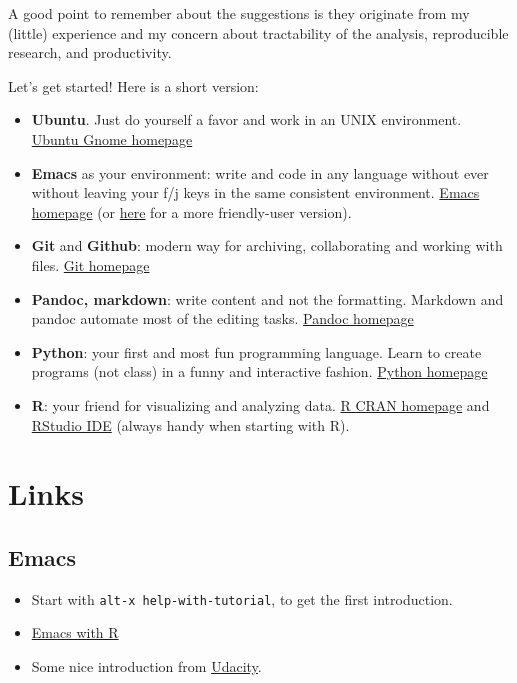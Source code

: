 \documentclass[11pt]{article}
\begin{document}
A good point to remember about the suggestions is they originate from my
(little) experience and my concern about tractability of the analysis,
reproducible research, and productivity.

Let's get started!  Here is a short version:
\begin{itemize}
\item \textbf{Ubuntu}. Just do yourself a favor and work in an UNIX environment.
\href{https://ubuntugnome.org/}{Ubuntu Gnome homepage}
\item \textbf{Emacs} as your environment: write and code in any language without ever
without leaving your f/j keys in the same consistent environment.
\href{https://www.gnu.org/software/emacs/}{Emacs homepage} (or \href{http://vgoulet.act.ulaval.ca/en/emacs/}{here} for a more friendly-user version).
\item \textbf{Git} and \textbf{Github}: modern way for archiving, collaborating and working
with files.
\href{https://git-scm.com/}{Git homepage}
\item \textbf{Pandoc, markdown}: write content and not the formatting. Markdown and pandoc
automate most of the editing tasks.
\href{http://pandoc.org/}{Pandoc homepage}
\item \textbf{Python}: your first and most fun programming language. Learn to create
programs (not class) in a funny and interactive fashion.
\href{https://www.python.org/}{Python homepage}
\item \textbf{R}: your friend for visualizing and analyzing data.
\href{https://cran.r-project.org/}{R CRAN homepage} and \href{https://www.rstudio.com/}{RStudio IDE} (always handy when starting with R).
\end{itemize}

\section{Links}
\label{sec:org5437cbb}
\subsection{Emacs}
\label{sec:org0f2c551}
\begin{itemize}
\item Start with \texttt{alt-x help-with-tutorial}, to get the first introduction.
\item \href{http://ess.r-project.org/index.php?Section=download}{Emacs with R}
\item Some nice introduction from \href{https://www.youtube.com/channel/UCGM8KgUXqsS4d8-4rgWRWKg}{Udacity}.
\end{itemize}
\end{document}
